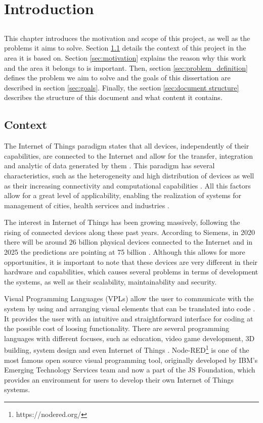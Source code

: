\chapter{Introduction} \label{chap:intro}

\section*{}

This chapter introduces the motivation and scope of this project, as well as the problems it aims to solve. Section \ref{sec:context} details the context of this project in the area it is based on. Section \ref{sec:motivation} explains the reason why this work and the area it belongs to is important. Then, section \ref{sec:problem_definition} defines the problem we aim to solve and the goals of this dissertation are described in section \ref{sec:goals}. Finally, the section \ref{sec:document structure} describes the structure of this document and what content it contains.

\section{Context} \label{sec:context}

The Internet of Things paradigm states that all devices, independently of their capabilities, are connected to the Internet and allow for the transfer, integration and analytic of data generated by them \cite{Buyya:2016:ITP:3050877}. This paradigm has several characteristics, such as the heterogeneity and high distribution of devices as well as their increasing connectivity and computational capabilities \cite{SoS}. All this factors allow for a great level of applicability, enabling the realization of systems for management of cities, health services and industries \cite{6851114}.
\par The interest in Internet of Things has been growing massively, following the rising of connected devices along these past years. According to Siemens, in 2020 there will be around 26 billion physical devices connected to the Internet and in 2025 the predictions are pointing at 75 billion \cite{tanweer}. Although this allows for more opportunities, it is important to note that these devices are very different in their hardware and capabilities, which causes several problems in terms of development the systems, as well as their scalability, maintainability and security. 
\par Visual Programming Languages (VPLs) allow the user to communicate with the system by using and arranging visual elements that can be translated into code \cite{vpl-book}. It provides the user with an intuitive and straightforward interface for coding at the possible cost of loosing functionality. There are several programming languages with different focuses, such as education, video game development, 3D building, system design and even Internet of Things \cite{Ray2017}. Node-RED\footnote{https://nodered.org/} is one of the most famous open source visual programming tool, originally developed by IBM’s Emerging Technology Services team and now a part of the JS Foundation, which provides an environment for users to develop their own Internet of Things systems.

